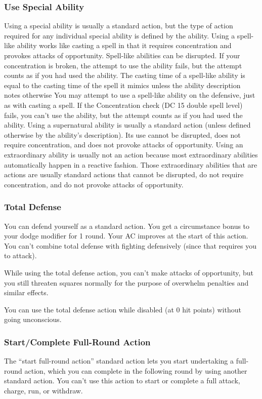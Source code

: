 \subsubsection{Use Special Ability}
Using a special ability is usually a standard action, but the type of action required for any individual special ability is defined by the ability.
 Using a spell-like ability works like casting a spell in that it requires concentration and provokes attacks of opportunity. Spell-like abilities can be disrupted. If your concentration is broken, the attempt to use the ability fails, but the attempt counts as if you had used the ability. The casting time of a spell-like ability is equal to the casting time of the spell it mimics unless the ability description notes otherwise
 You may attempt to use a spell-like ability on the defensive, just as with casting a spell. If the Concentration check (DC 15 \add double spell level) fails, you can't use the ability, but the attempt counts as if you had used the ability.
 Using a supernatural ability is usually a standard action (unless defined otherwise by the ability's description). Its use cannot be disrupted, does not require concentration, and does not provoke attacks of opportunity.
 Using an extraordinary ability is usually not an action because most extraordinary abilities automatically happen in a reactive fashion. Those extraordinary abilities that are actions are usually standard actions that cannot be disrupted, do not require concentration, and do not provoke attacks of opportunity.

\subsubsection{Total Defense}
You can defend yourself as a standard action. You get a  circumstance bonus to your dodge modifier for 1 round. Your AC improves at the start of this action. You can't combine total defense with fighting defensively (since that requires you to attack). \par While using the total defense action, you can't make attacks of opportunity, but you still threaten squares normally for the purpose of overwhelm penalties and similar effects.

You can use the total defense action while disabled (at 0 hit points) without going unconscious.

\subsubsection{Start/Complete Full-Round Action}
The ``start full-round action'' standard action lets you start undertaking a full-round action, which you can complete in the following round by using another standard action. You can't use this action to start or complete a full attack, charge, run, or withdraw.

